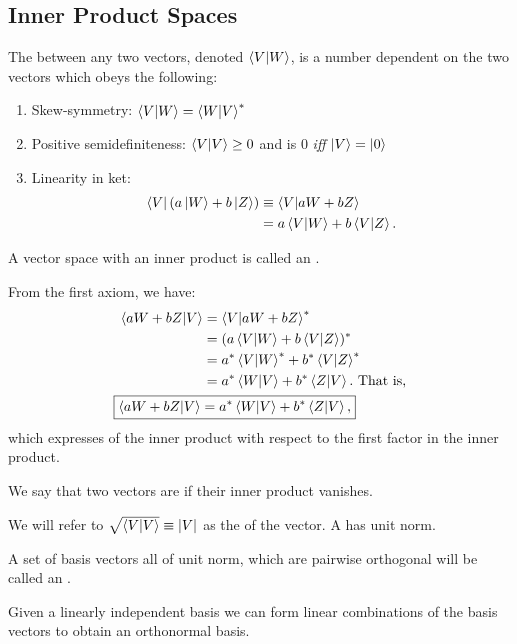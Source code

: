 \subsection{Inner Product Spaces}

\begin{shaded*}
The  between any two vectors, denoted $\braket{V}{W}$, is a number dependent on the two vectors which obeys the following:
\begin{enumerate}
    \item Skew-symmetry: $\braket{V}{W} = \braket{W}{V}^*$
    \item Positive semidefiniteness: $\braket{V}{V} \geq 0$ and is 0 \textit{iff} $\ket{V} = \ket{0}$
    \item Linearity in ket:
    \begin{align*}
        \bra{V} (a\ket{W} + b\ket{Z}) &\equiv \braket{V}{aW + bZ} \\
        &= a\braket{V}{W} + b\braket{V}{Z}.
    \end{align*}
\end{enumerate}
\end{shaded*}

A vector space with an inner product is called an .

From the first axiom, we have:
\begin{align}\label{antilinearity in bra}
    \braket{aW + bZ}{V} &= \braket{V}{aW + bZ}^* \nonumber \\
    &= (a\braket{V}{W} + b\braket{V}{Z})^* \nonumber \\
    &= a^*\braket{V}{W}^* + b^*\braket{V}{Z}^* \nonumber \\
    &= a^*\braket{W}{V} + b^*\braket{Z}{V}. \text{ That is,} \nonumber \\
    \Aboxed{\braket{aW + bZ}{V} &= a^*\braket{W}{V} + b^*\braket{Z}{V},}
\end{align}
which expresses  of the inner product with respect to the first factor in the inner product.

We say that two vectors are  if their inner product vanishes.

We will refer to $\sqrt{\braket{V}{V}} \equiv |V|$ as the  of the vector. A  has unit norm.

A set of basis vectors all of unit norm, which are pairwise orthogonal will be called an .

\begin{theorem}\label{gram-schmidt}
Given a linearly independent basis we can form linear combinations of the basis vectors to obtain an orthonormal basis.
\end{theorem}

